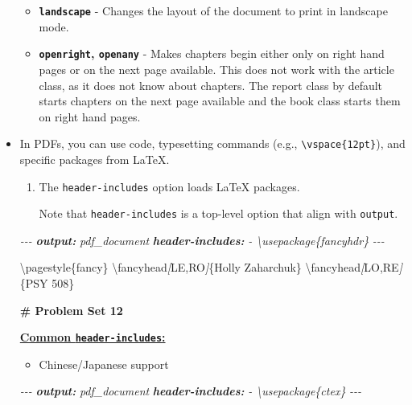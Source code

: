\documentclass[
  a4paper,
  twoside,
  openright]{book}
\newenvironment{Shaded}{\begin{snugshade}}{\end{snugshade}}
\newcommand{\AnnotationTok}[1]{\textcolor[rgb]{0.56,0.35,0.01}{\textbf{\textit{#1}}}}
\newcommand{\CommentTok}[1]{\textcolor[rgb]{0.56,0.35,0.01}{\textit{#1}}}
\newcommand{\FunctionTok}[1]{\textcolor[rgb]{0.13,0.29,0.53}{\textbf{#1}}}
\newcommand{\NormalTok}[1]{#1}
\newcommand{\OtherTok}[1]{\textcolor[rgb]{0.56,0.35,0.01}{#1}}
\providecommand{\tightlist}{%
  \setlength{\itemsep}{0pt}\setlength{\parskip}{0pt}}
\theoremstyle{definition}
\theoremstyle{definition}
\theoremstyle{definition}
\theoremstyle{definition}
\theoremstyle{remark}
\begin{document}
\begin{itemize}
\begin{itemize}
  \item
    \textbf{\texttt{landscape}} - Changes the layout of the document to print in landscape mode.
  \item
    \textbf{\texttt{openright}, \texttt{openany}} - Makes chapters begin either only on right hand pages or on the next page available. This does not work with the article class, as it does not know about chapters. The report class by default starts chapters on the next page available and the book class starts them on right hand pages.
  \end{itemize}
\item
  In PDFs, you can use code, typesetting commands (e.g., \texttt{\textbackslash{}vspace\{12pt\}}), and specific packages from LaTeX.

  \begin{enumerate}
  \def\labelenumi{\arabic{enumi}.}
  \item
    The \texttt{header-includes} option loads LaTeX packages.

    Note that \texttt{header-includes} is a top-level option that align with \texttt{output}.
  \end{enumerate}

\begin{Shaded}
\begin{Highlighting}[]
\CommentTok{{-}{-}{-}}
\AnnotationTok{output:}\CommentTok{ pdf\_document}
\AnnotationTok{header{-}includes:}
\CommentTok{  {-} \textbackslash{}usepackage\{fancyhdr\}}
\CommentTok{{-}{-}{-}}

\NormalTok{\textbackslash{}pagestyle\{fancy\}}
\NormalTok{\textbackslash{}fancyhead}\CommentTok{[}\OtherTok{LE,RO}\CommentTok{]}\NormalTok{\{Holly Zaharchuk\}}
\NormalTok{\textbackslash{}fancyhead}\CommentTok{[}\OtherTok{LO,RE}\CommentTok{]}\NormalTok{\{PSY 508\}}

\FunctionTok{\# Problem Set 12}
\end{Highlighting}
\end{Shaded}

  \href{https://github.com/hao203/rmarkdown-YAML?tab=readme-ov-file\#header-includes}{\textbf{Common \texttt{header-includes}:}}

  \begin{itemize}
  \tightlist
  \item
    Chinese/Japanese support
  \end{itemize}

\begin{Shaded}
\begin{Highlighting}[]
\CommentTok{{-}{-}{-}}
\AnnotationTok{output:}\CommentTok{ pdf\_document}
\AnnotationTok{header{-}includes:}
\CommentTok{  {-} \textbackslash{}usepackage\{ctex\}}
\CommentTok{{-}{-}{-}}
\end{Highlighting}
\end{Shaded}


\end{itemize}
\end{document}
